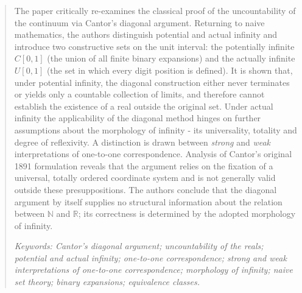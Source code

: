 \documentclass[12pt]{article}
\begin{document}
\begin{abstract}

The paper critically re-examines the classical proof of the uncountability of the continuum via Cantor’s diagonal argument. Returning to naive mathematics, the authors distinguish potential and actual infinity and introduce two constructive sets on the unit interval: the potentially infinite $C[0, 1]$ (the union of all finite binary expansions) and the actually infinite $U[0, 1]$ (the set in which every digit position is defined). It is shown that, under potential infinity, the diagonal construction either never terminates or yields only a countable collection of limits, and therefore cannot establish the existence of a real outside the original set. Under actual infinity the applicability of the diagonal method hinges on further assumptions about the morphology of infinity - its universality, totality and degree of reflexivity. A distinction is drawn between {\it strong} and {\it weak} interpretations of one-to-one correspondence. Analysis of Cantor’s original 1891 formulation reveals that the argument relies on the fixation of a universal, totally ordered coordinate system and is not generally valid outside these presuppositions. The authors conclude that the diagonal argument by itself supplies no structural information about the relation between $\mathbb{N}$ and $\mathbb{R}$; its correctness is determined by the adopted morphology of infinity.

{\it Keywords: Cantor’s diagonal argument; uncountability of the reals; potential and actual infinity; one-to-one correspondence; strong and weak interpretations of one-to-one correspondence; morphology of infinity; naive set theory; binary expansions; equivalence classes.}

\end{abstract}

\end{document}
